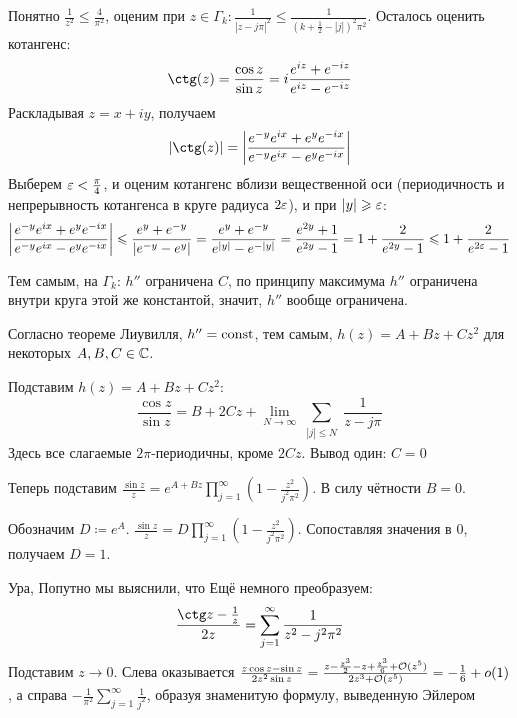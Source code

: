 \documentclass[a4paper]{report}
\begin{document}
{{{            Понятно $\frac{1}{z^2} \le \frac{4}{\pi^2}$, оценим при $z \in \Gamma_k: \frac{1}{|z - j\pi|^2} \le \frac{1}{(k + \frac{1}{2} - |j|)^2\pi^2}$.
            Осталось оценить котангенс:
            \[\ctg(z) = \frac{\cos z}{\sin z} = i \frac{e^{iz} + e^{-iz}}{e^{iz} - e^{-iz}}\]
        Раскладывая $z = x + iy$, получаем
            \[|\ctg(z)| = \abs{\frac{e^{-y}e^{ix} + e^y e^{-ix}}{e^{-y}e^{ix} - e^y e^{-ix}}}\]
            Выберем $\varepsilon < \frac{\pi}{4}$, и оценим котангенс вблизи вещественной оси (периодичность и непрерывность котангенса в круге радиуса $2\varepsilon$), и при $|y| \geqslant \varepsilon$:
            \[\left|\frac{e^{-y}e^{ix} + e^y e^{-ix}}{e^{-y}e^{ix} - e^y e^{-ix}}\right| \leqslant \frac{e^y + e^{-y}}{|e^{-y} - e^y|} = \frac{e^y + e^{-y}}{e^{|y|} - e^{-|y|}} = \frac{e^{2y} + 1}{e^{2y} - 1} = 1 + \frac{2}{e^{2y} - 1} \leqslant 1 + \frac{2}{e^{2\varepsilon} - 1}\]
        \item Тем самым, на $\Gamma_k$: $h''$ ограничена $C$, по принципу максимума $h''$ ограничена внутри круга этой же константой, значит, $h''$ вообще ограничена.

            Согласно теореме Лиувилля, $h'' = \operatorname{const}$, тем самым, $h(z) = A + Bz + C z^2$ для некоторых $A,B,C \in \mathbb{C}$.
        \item Подставим $h(z) =  A + Bz + C z^2$:
        \[\frac{\cos z}{\sin z} = B + 2Cz + \lim\limits_{N \to \infty}\sum\limits_{\substack{|j| \le N}}\frac{1}{z - j\pi}\]
        Здесь все слагаемые $2\pi$-периодичны, кроме $2 C z$. Вывод один: $C = 0$
        \item Теперь подставим $\frac{\sin z}{z} = e^{A + Bz}\prod\limits_{j = 1}^{\infty}\left(1 - \frac{z^2}{j^2\pi^2}\right)$.
            В силу чётности $B = 0$.
        \item   Обозначим $D \coloneqq e^A$. $\frac{\sin z}{z} = D\prod\limits_{j = 1}^{\infty}\left(1 - \frac{z^2}{j^2\pi^2}\right)$.
        Сопоставляя значения в $0$, получаем $D = 1$.
        }
    }
    }
    Ура,
    Попутно мы выяснили, что 
    Ещё немного преобразуем:
    \[\frac{\ctg z - \frac{1}{z}}{2 z} = \sum\limits_{j = 1}^{\infty}\frac{1}{z^2 - j^2\pi^2}\]
    Подставим $z \to 0$.
    Слева оказывается $\frac{z \cos z - \sin z}{2 z^2 \sin z} = \frac{z - \frac{z^3}{2} - z + \frac{z^3}{6} + \mathcal{O}(z^5)}{2z^3 + \mathcal{O}(z^5)} = -\frac{1}{6} + o(1)$, а справа $-\frac{1}{\pi^2}\sum\limits_{j = 1}^{\infty}\frac{1}{j^2}$, образуя знаменитую формулу, выведенную Эйлером
\end{document}
